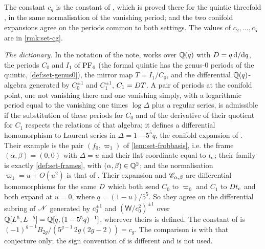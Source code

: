 \begin{rmk}
\label{rmk:mai-constant}
The constant $c_g$ is the constant of \cite[Conj.~1.5]{CGYZ26}, which is proved there for the quintic threefold \cite[Thm.~2]{CGYZ26}, in the same normalisation of the vanishing period; and the two conifold expansions agree on the periods common to both settings. The values of $c_2,\dots,c_5$ are in \cref{rmk:set-cg}.

\emph{The dictionary.} In the notation of the note, \cite[Def.~1.1]{CGYZ26} works over $\mathbb{Q}(q)$ with $D=q\,\mathrm{d}/\mathrm{d} q$, the periods $C_0$ and $I_1$ of $\mathrm{PF}_{4}$ (the formal quintic has the genus-$0$ periods of the quintic, \cref{def:set-genus0}), the mirror map $T=I_1/C_0$, and the differential $\mathbb{Q}(q)$-algebra generated by $C_0^{\pm1}$ and $C_1^{\pm1}$, $C_1=D T$. A pair of periods at the conifold point, one not vanishing there and one vanishing simply, with a logarithmic period equal to the vanishing one times $\log\Delta$ plus a regular series, is admissible \cite[Def.~1.2]{CGYZ26} if the substitution of these periods for $C_0$ and of the derivative of their quotient for $C_1$ respects the relations of that algebra; it defines a differential homomorphism to Laurent series in $\Delta=1-5^5q$, the conifold expansion of \cite{CGYZ26}. Their example \cite[Ex.~1.3]{CGYZ26} is the pair $(f_0,\varpi_1)$ of \cref{lem:set-frobbasis}, i.e. the frame $(\alpha,\beta)=(0,0)$ with $\Delta=u$ and their flat coordinate equal to $t_{\mathrm{c}}$; their family \cite[Rem.~1.4]{CGYZ26} is exactly \cref{def:set-frames}, with $(\alpha,\beta)\in\mathbb{Q}^2$; and the normalisation $\varpi_1=u+O(u^2)$ is that of \cite[\S4.2, Prop.-Def.~4.5\,(1)]{CGYZ26}. Their expansion and $\mathscr{C}_{\alpha,\beta}$ are differential homomorphisms for the same $D$ which both send $C_0$ to $\varpi_0$ and $C_1$ to $Dt_{\mathrm{c}}$ and both expand at $u=0$, where $q=(1-u)/5^5$. So they agree on the differential subring of $\mathscr{N}$ generated by $c_0^{\pm1}$ and $(\mathsf W/c_0^2)^{\pm1}$ over $\mathbb{Q}[L^5,L^{-5}]=\mathbb{Q}[q,(1-5^5q)^{-1}]$, wherever theirs is defined. The constant of \cite[Conj.~1.5]{CGYZ26} is $(-1)^{g-1}B_{2g}/(5^{g-1}\,2g(2g-2))=c_g$. The comparison is with that conjecture only; the sign convention of \cite[Def.~1.8]{CGYZ26} is different and is not used.


\end{rmk}
